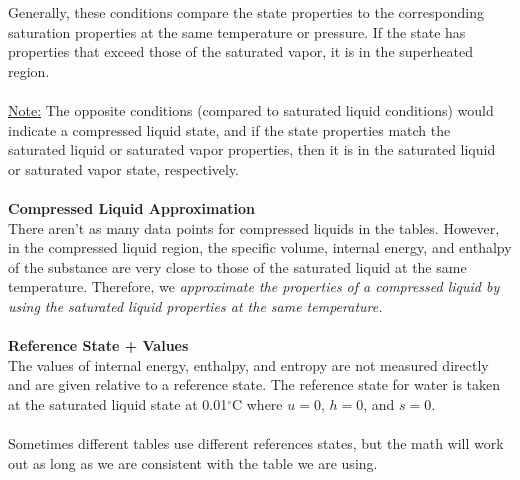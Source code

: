 \documentclass[12pt]{article}
\begin{document}
Generally, these conditions compare the state properties to the corresponding saturation properties at the same temperature or pressure. If the state has properties that exceed those of the saturated vapor, it is in the superheated region.\\\\
\underline{Note:} The opposite conditions (compared to saturated liquid conditions) would indicate a compressed liquid state, and if the state properties match the saturated liquid or saturated vapor properties, then it is in the saturated liquid or saturated vapor state, respectively.\\\\
\textbf{Compressed Liquid Approximation}\\
There aren't as many data points for compressed liquids in the tables. However, in the compressed liquid region, the specific volume, internal energy, and enthalpy of the substance are very close to those of the saturated liquid at the same temperature. Therefore, we \textit{approximate the properties of a compressed liquid by using the saturated liquid properties at the same temperature.}\\\\
\textbf{Reference State + Values}\\
The values of internal energy, enthalpy, and entropy are not measured directly and are given relative to a reference state. The reference state for water is taken at the saturated liquid state at 0.01$^\circ$C where $u=0$, $h=0$, and $s=0$.\\\\
Sometimes different tables use different references states, but the math will work out as long as we are consistent with the table we are using. 
\end{document}
